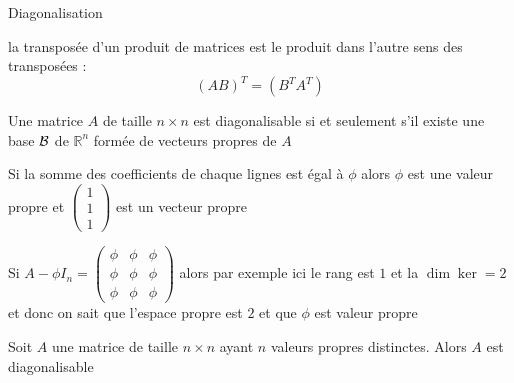 \begin{parag}{Diagonalisation}
\begin{truc}
    la transposée d'un produit de matrices est le produit dans l'autre sens des transposées :
    \[(AB)^T = (B^TA^T)\]
\end{truc}
    \begin{theoreme}
        Une matrice $A$ de taille $n \times n$ est diagonalisable si et seulement s'il existe une base $\mathcal{B}$ de $\mathbb{R}^n$ formée de vecteurs propres de $A$
    \end{theoreme}
    \begin{truc}
        Si la somme des coefficients de chaque lignes est égal à $\phi$ alors $\phi$ est une valeur propre et $\begin{pmatrix}
            1 \\ 1 \\ 1
        \end{pmatrix}$ est un vecteur propre
    \end{truc}
    \begin{truc}
        Si $A - \phi I_n = \begin{pmatrix}
            \phi & \phi & \phi\\
            \phi & \phi & \phi\\
            \phi & \phi & \phi
        \end{pmatrix}$ alors par exemple ici le rang est $1$ et la $\dim \ker = 2$ et donc on sait que l'espace propre est $2$ et que $\phi$ est valeur propre
    \end{truc}
    \begin{theoreme}
        Soit $A$ une matrice de taille $n \times n$ ayant $n$ valeurs propres distinctes. Alors $A$ est diagonalisable
    \end{theoreme}


\end{parag}
